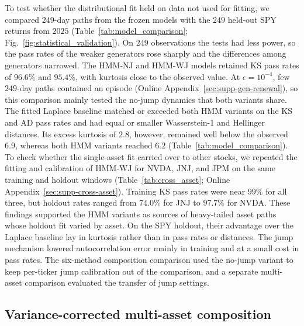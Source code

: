 To test whether the distributional fit held on data not used for
fitting, we compared $249$-day paths from the frozen models with the
$249$ held-out SPY returns from $2025$
(Table~\ref{tab:model_comparison};
Fig.~\ref{fig:statistical_validation}). On $249$ observations the
tests had less power, so the pass rates of the weaker generators rose
sharply and the differences among generators narrowed. The HMM-NJ and
HMM-WJ models retained KS pass rates of $96.6\%$ and $95.4\%$, with
kurtosis close to the observed value. At $\epsilon=10^{-4}$, few
$249$-day paths contained an episode (Online
Appendix~\ref{sec:supp-gen-renewal}), so this comparison mainly tested
the no-jump dynamics that both variants share. The fitted Laplace
baseline matched or exceeded both HMM variants on the KS and AD pass
rates and had equal or smaller Wasserstein-1 and Hellinger distances.
Its excess kurtosis of $2.8$, however, remained well below the observed
$6.9$, whereas both HMM variants reached $6.2$
(Table~\ref{tab:model_comparison}). To check whether the single-asset
fit carried over to other stocks, we repeated the fitting and
calibration of HMM-WJ for NVDA, JNJ, and JPM on the same training and
holdout windows (Table~\ref{tab:cross_asset}; Online
Appendix~\ref{sec:supp-cross-asset}). Training KS pass rates were near $99\%$
for all three, but holdout rates ranged from $74.0\%$ for JNJ to
$97.7\%$ for NVDA. These findings supported the HMM variants as sources of heavy-tailed
asset paths whose holdout fit varied by asset. On the SPY holdout,
their advantage over the Laplace baseline lay in kurtosis rather than
in pass rates or distances. The jump mechanism lowered autocorrelation error mainly in
training and at a small cost in pass rates. The six-method composition comparison used the no-jump variant to
keep per-ticker jump calibration out of the comparison, and a separate
multi-asset comparison evaluated the transfer of jump settings.


\subsection{Variance-corrected multi-asset composition}

